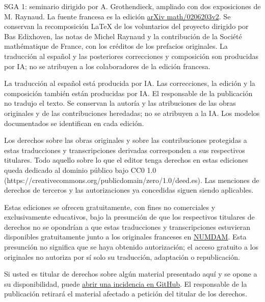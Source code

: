 \begingroup\small
SGA 1: seminario dirigido por A. Grothendieck, ampliado con dos exposiciones de M. Raynaud. La fuente francesa es la edición \href{https://arxiv.org/abs/math/0206203v2}{arXiv math/0206203v2}. Se conservan la recomposición LaTeX de los voluntarios del proyecto dirigido por Bas Edixhoven, las notas de Michel Raynaud y la contribución de la Société mathématique de France, con los créditos de los prefacios originales. La traducción al español y las posteriores correcciones y composición son producidas por IA; no se atribuyen a los colaboradores de la edición francesa.

La traducción al español está producida por IA. Las correcciones, la edición y la composición también están producidas por IA. El responsable de la publicación no tradujo el texto. Se conservan la autoría y las atribuciones de las obras originales y de las contribuciones heredadas; no se atribuyen a la IA. Los modelos documentados se identifican en cada edición.
\par\endgroup\clearpage
\begingroup\small
Los derechos sobre las obras originales y sobre las contribuciones protegidas a estas traducciones y transcripciones derivadas corresponden a sus respectivos titulares. Todo aquello sobre lo que el editor tenga derechos en estas ediciones queda dedicado al dominio público bajo CC0 1.0 (https://creativecommons.org/publicdomain/zero/1.0/deed.es). Las menciones de derechos de terceros y las autorizaciones ya concedidas siguen siendo aplicables.

Estas ediciones se ofrecen gratuitamente, con fines no comerciales y exclusivamente educativos, bajo la presunción de que los respectivos titulares de derechos no se opondrían a que estas traducciones y transcripciones estuvieran disponibles gratuitamente junto a los originales franceses en \href{https://www.numdam.org/}{NUMDAM}. Esta presunción no significa que se haya obtenido autorización; el acceso gratuito a los originales no autoriza por sí solo su traducción, adaptación o republicación.

Si usted es titular de derechos sobre algún material presentado aquí y se opone a su disponibilidad, puede \href{https://github.com/KokunoYumeto/sga-es/issues}{abrir una incidencia en GitHub}. El responsable de la publicación retirará el material afectado a petición del titular de los derechos.

\par\endgroup\clearpage
